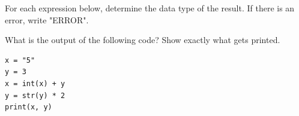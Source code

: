 \documentclass{csexam}
\begin{document}
\begin{questions}

\question[6] For each expression below, determine the data type of the result. If there is an error, write "ERROR".


\question[8] What is the output of the following code? Show exactly what gets printed.

\begin{lstlisting}
x = "5"
y = 3
x = int(x) + y
y = str(y) * 2
print(x, y)
\end{lstlisting}
\vspace{2.5cm}


\end{questions}
\end{document}
